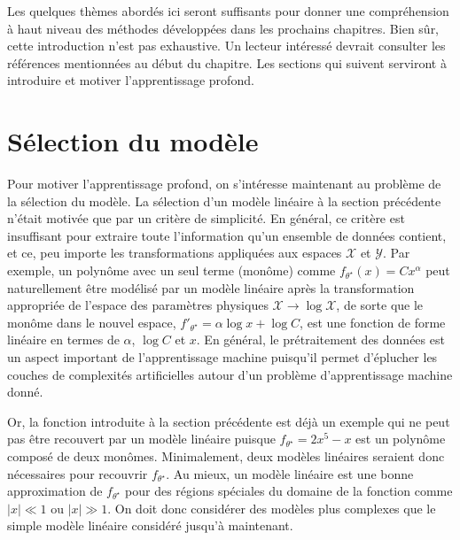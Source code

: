Les quelques thèmes abordés ici seront suffisants
pour donner une compréhension à haut niveau des méthodes développées dans les prochains chapitres. Bien sûr, 
cette introduction n'est pas exhaustive. Un lecteur intéressé devrait consulter les références mentionnées au début du 
chapitre. Les sections qui suivent serviront à introduire et motiver l'apprentissage profond.


\section{Sélection du modèle}\label{sec:selection modele}

Pour motiver l'apprentissage profond, on s'intéresse maintenant au problème de la sélection du modèle. 
La sélection d'un modèle linéaire à la section précédente n'était motivée que par un critère de simplicité. En général, 
ce critère est insuffisant pour extraire toute l'information qu'un ensemble de données contient, et ce, peu importe les transformations appliquées 
aux espaces $\mathcal{X}$ et $\mathcal{Y}$. Par exemple, un polynôme avec un seul terme (monôme) comme $f_{\theta^{\star}}(x) = Cx^{\alpha}$ peut naturellement être modélisé 
par un modèle linéaire après la transformation appropriée de l'espace des paramètres physiques $\mathcal{X} \rightarrow  \log \mathcal{X}$, de sorte 
que le monôme dans le nouvel espace, $f'_{\theta^{\star}} = \alpha \log x + \log C$, est une fonction de forme linéaire en termes de $\alpha$, $\log C$ et $x$.
En général, le prétraitement des données est un aspect important de l'apprentissage machine puisqu'il permet d'éplucher les couches 
de complexités artificielles autour d'un problème d'apprentissage machine donné.

Or, la fonction introduite à la section précédente est déjà un exemple qui ne peut pas être recouvert par un modèle linéaire puisque 
$f_{\theta^{\star}} = 2x^{5} - x$ est un polynôme composé de deux monômes. Minimalement, deux modèles linéaires seraient donc nécessaires pour recouvrir $f_{\theta^{\star}}$.
Au mieux, un modèle linéaire est une bonne approximation de $f_{\theta^{\star}}$ pour des régions spéciales du domaine de la fonction comme $|x| \ll 1$ ou $|x| \gg 1$.
On doit donc considérer des modèles plus complexes que le simple modèle linéaire considéré jusqu'à maintenant.

